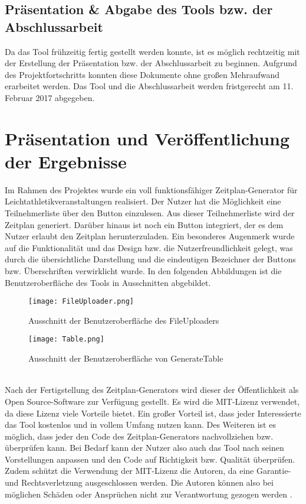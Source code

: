 \subsection{Präsentation \& Abgabe des Tools bzw. der Abschlussarbeit}
Da das Tool frühzeitig fertig gestellt werden konnte, ist es möglich rechtzeitig mit der Erstellung der Präsentation bzw. der Abschlussarbeit zu beginnen. Aufgrund des Projektfortschritts konnten diese Dokumente ohne großen Mehraufwand erarbeitet werden. Das Tool und die Abschlussarbeit werden fristgerecht am 11. Februar 2017 abgegeben.

\section{Präsentation und Veröffentlichung der Ergebnisse}
Im Rahmen des Projektes wurde ein voll funktionsfähiger Zeitplan-Generator für Leichtathletikveranstaltungen realisiert. Der Nutzer hat die Möglichkeit eine Teilnehmerliste über den Button einzulesen. Aus dieser Teilnehmerliste wird der Zeitplan generiert. Darüber hinaus ist noch ein Button integriert, der es dem Nutzer erlaubt den Zeitplan herunterzuladen. Ein besonderes Augenmerk wurde auf die Funktionalität und das Design bzw. die Nutzerfreundlichkeit gelegt, was durch die übersichtliche Darstellung und die eindeutigen Bezeichner der Buttons bzw. Überschriften verwirklicht wurde. In den folgenden Abbildungen ist die Benutzeroberfläche des Tools in Ausschnitten abgebildet.
\begin{figure}[htbp]
  \centering
  \texttt{[image: FileUploader.png]}
  \caption{Ausschnitt der Benutzeroberfläche des FileUploaders}
  \label{fig:Fig1}
\end{figure}
\begin{figure}[htbp]
  \centering
  \texttt{[image: Table.png]}
  \caption{Ausschnitt der Benutzeroberfläche von GenerateTable}
  \label{fig:Fig1}
\end{figure}\\
Nach der Fertigstellung des Zeitplan-Generators wird dieser der Öffentlichkeit als Open Source-Software zur Verfügung gestellt. Es wird die MIT-Lizenz verwendet, da diese Lizenz viele Vorteile bietet. Ein großer Vorteil ist, dass jeder Interessierte das Tool kostenlos und in vollem Umfang nutzen kann. Des Weiteren ist es möglich, dass jeder den Code des Zeitplan-Generators nachvollziehen bzw. überprüfen kann. Bei Bedarf kann der Nutzer also auch das Tool nach seinen Vorstellungen anpassen und den Code auf Richtigkeit bzw. Qualität überprüfen. Zudem schützt die Verwendung der MIT-Lizenz die Autoren, da eine Garantie- und Rechtsverletzung ausgeschlossen werden. Die Autoren können also bei möglichen Schäden oder Ansprüchen nicht zur Verantwortung gezogen werden \cite{mitlicense}. \\
